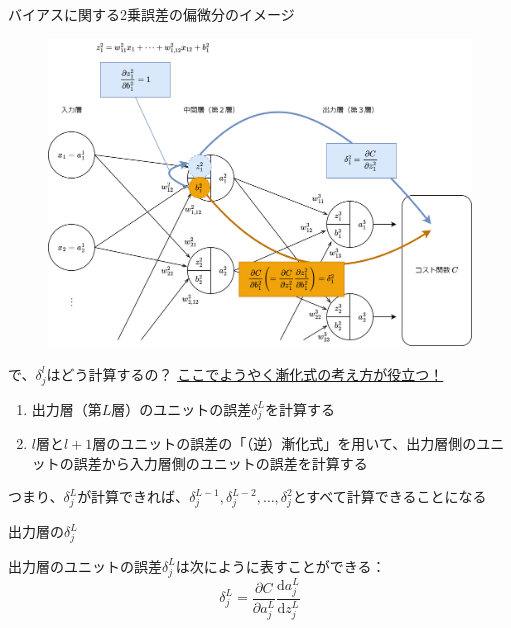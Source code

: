 \documentclass[dvipdfmx,aspectratio=169]{beamer}
\begin{document}
	\begin{frame}{バイアスに関する2乗誤差の偏微分のイメージ}
		\begin{figure}
			\centering
			\includegraphics[width=0.7\linewidth]{img/image-of-the-partial-derivative-of-the-squared-error-with-respect-to-the-bias}
		\end{figure}
	\end{frame}
	\begin{frame}{で、$ \delta^l_j $はどう計算するの？}
		\underline{ここでようやく\alert{漸化式}の考え方が役立つ！}
		\begin{enumerate}
			\item 出力層（第$ L $層）のユニットの誤差$ \delta^L_j $を計算する
			\item $ l $層と$ l+1 $層のユニットの誤差の「（逆）漸化式」を用いて、出力層側のユニットの誤差から入力層側のユニットの誤差を計算する
		\end{enumerate}
		つまり、$ \delta^L_j $が計算できれば、$ \delta^{L-1}_j, \delta^{L-2}_j,\dots, \delta^2_j $とすべて計算できることになる
	\end{frame}
	\begin{frame}{出力層の$ \delta^L_j $}
		\begin{screen}
			出力層のユニットの誤差$ \delta^L_j $は次にように表すことができる：
			\begin{equation}
				\delta^L_j = \dfrac{\partial C}{\partial a^L_j}\dfrac{\mathrm{d}a^L_j}{\mathrm{d}z^L_j}
			\end{equation}
		\end{screen}
		
		
		
	\end{frame}
\end{document}

